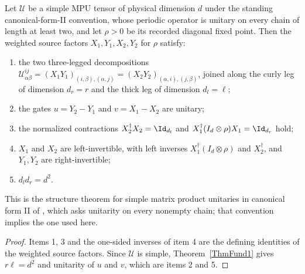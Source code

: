 \begin{lemma}
    \label{thm:mpu_three_legged_decomposition}
    \leanok
    Let $\mathcal U$ be a simple MPU tensor of physical dimension $d$ under
    the standing canonical-form-II convention, whose periodic operator is
    unitary on every chain of length at least two, and let $\rho>0$ be its
    recorded diagonal fixed point. Then the weighted source factors
    $X_1,Y_1,X_2,Y_2$ for $\rho$ satisfy:
    \begin{enumerate}
        \item the two three-legged decompositions
              $\mathcal U^{ij}_{\alpha\beta}=(X_1Y_1)_{(i,\beta),(\alpha,j)}
                  =(X_2Y_2)_{(\alpha,i),(j,\beta)}$, joined along the curly leg of
              dimension $d_r=r$ and the thick leg of dimension $d_l=\ell$;
        \item the gates $u=Y_2\mathbin{-}Y_1$ and $v=X_1\mathbin{-}X_2$ are
              unitary;
        \item the normalized contractions $X_2^\dagger X_2=\Id_{d_l}$ and
              $X_1^\dagger(I_d\otimes\rho)X_1=\Id_{d_r}$ hold;
        \item $X_1$ and $X_2$ are left-invertible, with left inverses
              $X_1^\dagger(I_d\otimes\rho)$ and $X_2^\dagger$, and $Y_1,Y_2$ are
              right-invertible;
        \item $d_ld_r=d^2$.
    \end{enumerate}
    This is the structure theorem for simple matrix product unitaries in
    canonical form II of \cite{FrancoRubio2025MPUGauging}, which asks
    unitarity on every nonempty chain; that convention implies the one used
    here.
\end{lemma}

\begin{proof}\leanok
    Items 1, 3 and the one-sided inverses of item 4 are the defining
    identities of the weighted source factors. Since $\mathcal U$ is simple,
    Theorem~\ref{ThmFund1} gives $r\ell=d^2$ and unitarity of $u$ and $v$,
    which are items 2 and 5.
\end{proof}

